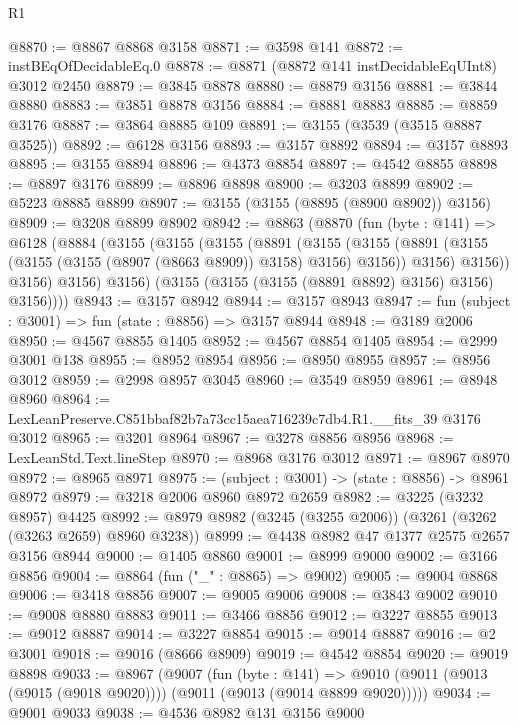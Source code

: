 \begin{lexlean}{R1}
\begin{coremodule}
@8870 := @8867 @8868 @3158
@8871 := @3598 @141
@8872 := instBEqOfDecidableEq.{0}
@8878 := @8871 (@8872 @141 instDecidableEqUInt8) @3012 @2450
@8879 := @3845 @8878
@8880 := @8879 @3156
@8881 := @3844 @8880
@8883 := @3851 @8878 @3156
@8884 := @8881 @8883
@8885 := @8859 @3176
@8887 := @3864 @8885 @109
@8891 := @3155 (@3539 (@3515 @8887 @3525))
@8892 := @6128 @3156
@8893 := @3157 @8892
@8894 := @3157 @8893
@8895 := @3155 @8894
@8896 := @4373 @8854
@8897 := @4542 @8855
@8898 := @8897 @3176
@8899 := @8896 @8898
@8900 := @3203 @8899
@8902 := @5223 @8885 @8899
@8907 := @3155 (@3155 (@8895 (@8900 @8902)) @3156)
@8909 := @3208 @8899 @8902
@8942 := @8863
    (@8870
      (fun (byte : @141) =>
      @6128
        (@8884
          (@3155
            (@3155
              (@3155
                (@8891
                  (@3155
                    (@3155
                      (@8891 (@3155 (@3155 (@3155 (@8907 (@8663 @8909)) @3158) @3156) @3156))
                      @3156)
                    @3156))
                @3156)
              @3156)
            @3156)
          (@3155 (@3155 (@3155 (@8891 @8892) @3156) @3156) @3156))))
@8943 := @3157 @8942
@8944 := @3157 @8943
@8947 := fun (subject : @3001) => fun (state : @8856) => @3157 @8944
@8948 := @3189 @2006
@8950 := @4567 @8855 @1405
@8952 := @4567 @8854 @1405
@8954 := @2999 @3001 @138
@8955 := @8952 @8954
@8956 := @8950 @8955
@8957 := @8956 @3012
@8959 := @2998 @8957 @3045
@8960 := @3549 @8959
@8961 := @8948 @8960
@8964 := LexLeanPreserve.C851bbaf82b7a73cc15aea716239c7db4.R1.__fits_39 @3176 @3012
@8965 := @3201 @8964
@8967 := @3278 @8856 @8956
@8968 := LexLeanStd.Text.lineStep
@8970 := @8968 @3176 @3012
@8971 := @8967 @8970
@8972 := @8965 @8971
@8975 := (subject : @3001) -> (state : @8856) -> @8961 @8972
@8979 := @3218 @2006 @8960 @8972 @2659
@8982 := @3225 (@3232 @8957) @4425
@8992 := @8979 @8982 (@3245 (@3255 @2006)) (@3261 (@3262 (@3263 @2659) @8960 @3238))
@8999 := @4438 @8982 @47 @1377 @2575 @2657 @3156 @8944
@9000 := @1405 @8860
@9001 := @8999 @9000
@9002 := @3166 @8856
@9004 := @8864 (fun ("_" : @8865) => @9002)
@9005 := @9004 @8868
@9006 := @3418 @8856
@9007 := @9005 @9006
@9008 := @3843 @9002
@9010 := @9008 @8880 @8883
@9011 := @3466 @8856
@9012 := @3227 @8855
@9013 := @9012 @8887
@9014 := @3227 @8854
@9015 := @9014 @8887
@9016 := @2 @3001
@9018 := @9016 (@8666 @8909)
@9019 := @4542 @8854
@9020 := @9019 @8898
@9033 := @8967
    (@9007
      (fun (byte : @141) =>
      @9010 (@9011 (@9013 (@9015 (@9018 @9020)))) (@9011 (@9013 (@9014 @8899 @9020)))))
@9034 := @9001 @9033
@9038 := @4536 @8982 @131 @3156 @9000

\end{coremodule}
\end{lexlean}
